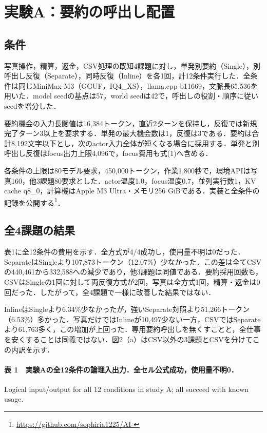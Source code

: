 \documentclass{article}
\begin{document}
\section{実験A：要約の呼出し配置}
\subsection{条件}
写真操作，精算，返金，CSV処理の既知4課題に対し，単発別要約（Single），別呼出し反復（Separate），同時反復（Inline）を各1回，計12条件実行した．全条件は同じMiniMax-M3（GGUF，IQ4\_XS），llama.cpp b11669，文脈長65,536を用いた．model seedの基点は57，world seedは42で，呼出しの役割・順序に従いseedを増分した．

要約機会の入力長閾値は16,384トークン，直近2ターンを保持し，反復では新規完了ターン3以上を要求する．単発の最大機会数は1，反復は3である．要約は合計8,192文字以下とし，次のactor入力全体が短くなる場合に採用する．単発と別呼出し反復はfocus出力上限4,096で，focus費用も式(1)へ含める．

各条件の上限は80モデル要求，450,000トークン，作業1,800秒で，環境APIは写真160，他3課題80要求とした．actor温度1.0，focus温度0.7，並列実行数1，KV cache q8\_0，計算機はApple M3 Ultra・メモリ256 GiBである．実装と全条件の記録を公開する\footnote{\url{https://github.com/sophiria1225/AI-}}．

\subsection{全4課題の結果}
表1に全12条件の費用を示す．全方式が4/4成功し，使用量不明は0だった．SeparateはSingleより107,873トークン（12.07\%）少なかった．この差は全てCSVの440,461から332,588への減少であり，他3課題は同値である．要約採用回数も，CSVはSingleの1回に対して両反復方式が2回，写真は全方式1回，精算・返金は0回だった．したがって，全4課題で一様に改善した結果ではない．

InlineはSingleより6.34\%少なかったが，強いSeparate対照より51,266トークン（6.53\%）多かった．写真だけではInlineが10,497少ない一方，CSVではSeparateより61,763多く，この増加が上回った．専用要約呼出しを無くすことと，全仕事を安くすることは同義ではない．図2（a）はCSV以外の3課題とCSVを分けてこの内訳を示す．

\paragraph*{表 1　実験Aの全12条件の論理入出力．全セル公式成功，使用量不明0．}
\noindent Logical input/output for all 12 conditions in study A; all succeed with known usage.
\end{document}
